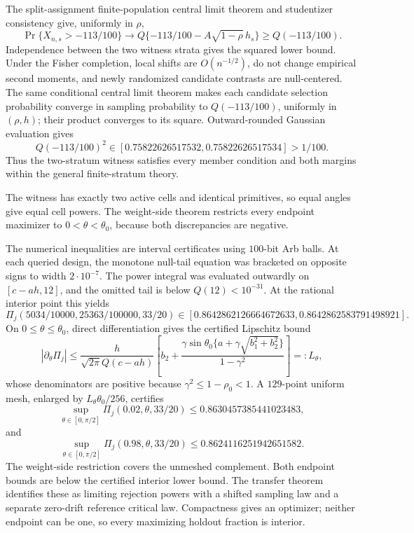 The split-assignment finite-population central limit theorem and studentizer consistency give, uniformly in \(\rho\),
\[
\Pr\{X_{n,s}>-113/100\}
\longrightarrow Q\{-113/100-A\sqrt{1-\rho}\,h_s\}
\ge Q(-113/100).
\]
Independence between the two witness strata gives the squared lower bound.  Under the Fisher completion, local shifts are \(O(n^{-1/2})\), do not change empirical second moments, and newly randomized candidate contrasts are null-centered.  The same conditional central limit theorem makes each candidate selection probability converge in sampling probability to \(Q(-113/100)\), uniformly in \((\rho,h)\); their product converges to its square.  Outward-rounded Gaussian evaluation gives
\[
Q(-113/100)^2\in[0.75822626517532,0.75822626517534]>1/100.
\]
Thus the two-stratum witness satisfies every member condition and both margins within the general finite-stratum theory.

The witness has exactly two active cells and identical primitives, so equal angles give equal cell powers.  The weight-side theorem restricts every endpoint maximizer to \(0<\theta<\theta_0\), because both discrepancies are negative.

The numerical inequalities are interval certificates using \(100\)-bit Arb balls.  At each queried design, the monotone null-tail equation was bracketed on opposite signs to width \(2\cdot10^{-7}\).  The power integral was evaluated outwardly on \([c-ah,12]\), and the omitted tail is below \(Q(12)<10^{-31}\).  At the rational interior point this yields
\[
\Pi_j(5034/10000,25363/100000,33/20)
\in[0.8642862126664672633,0.8642862583791498921].
\]
On \(0\le\theta\le\theta_0\), direct differentiation gives the certified Lipschitz bound
\[
|\partial_\theta\Pi_j|
\le\frac{h}{\sqrt{2\pi}Q(c-ah)}
\left[b_2+
\frac{\gamma\sin\theta_0\{a+\gamma\sqrt{b_1^2+b_2^2}\}}
{1-\gamma^2}\right]=:L_\theta,
\]
whose denominators are positive because \(\gamma^2\le1-\rho_0<1\).  A \(129\)-point uniform mesh, enlarged by \(L_\theta\theta_0/256\), certifies
\[
\sup_{\theta\in[0,\pi/2]}\Pi_j(0.02,\theta,33/20)
\le0.8630457385441023483,
\]
and
\[
\sup_{\theta\in[0,\pi/2]}\Pi_j(0.98,\theta,33/20)
\le0.8624116251942651582.
\]
The weight-side restriction covers the unmeshed complement.  Both endpoint bounds are below the certified interior lower bound.  The transfer theorem identifies these as limiting rejection powers with a shifted sampling law and a separate zero-drift reference critical law.  Compactness gives an optimizer; neither endpoint can be one, so every maximizing holdout fraction is interior.

